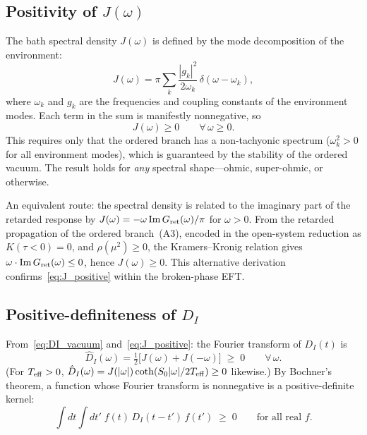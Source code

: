 \documentclass[11pt,a4paper]{article}
\numberwithin{equation}{section}
\begin{document}
\subsection*{Positivity of $J(\omega)$}

The bath spectral density $J(\omega)$ is defined by the mode
decomposition of the environment:
\begin{equation}
  J(\omega)
  = \pi\sum_k \frac{|g_k|^2}{2\omega_k}\,\delta(\omega-\omega_k),
  \label{eq:J_def}
\end{equation}
where $\omega_k$ and $g_k$ are the frequencies and coupling constants
of the environment modes.
Each term in the sum is manifestly nonnegative, so
\begin{equation}
  J(\omega) \geq 0 \qquad\forall\,\omega\geq 0.
  \label{eq:J_positive}
\end{equation}
This requires only that the ordered branch has a
non-tachyonic spectrum ($\omega_k^2>0$ for all environment modes),
which is guaranteed by the stability of the ordered vacuum.
The result holds for \emph{any} spectral shape---ohmic, super-ohmic,
or otherwise.

An equivalent route: the spectral density is related to the imaginary
part of the retarded response by $J(\omega)=-\omega\,{\rm Im}\,
G_{\rm ret}(\omega)/\pi$ for $\omega>0$.
From the retarded propagation of the ordered branch~(A3),
encoded in the open-system reduction as $K(\tau<0)=0$,
and $\rho(\mu^2)\geq 0$, the Kramers--Kronig relation gives $\omega\cdot{\rm Im}\,G_{\rm ret}
(\omega)\leq 0$, hence $J(\omega)\geq 0$.
This alternative derivation confirms~\eqref{eq:J_positive} within
the broken-phase EFT.

\subsection*{Positive-definiteness of $D_I$}

From~\eqref{eq:DI_vacuum} and~\eqref{eq:J_positive}:
the Fourier transform of $D_I(t)$ is
\begin{equation}
  \hat D_I(\omega) = \tfrac{1}{2}\bigl[J(\omega)+J(-\omega)\bigr]
  \;\geq\; 0
  \qquad\forall\,\omega.
\end{equation}
(For $T_{\rm eff}>0$, $\hat D_I(\omega) = J(|\omega|)\coth(S_0|\omega|/
2T_{\rm eff})\geq 0$ likewise.)
By Bochner's theorem, a function whose Fourier transform is
nonnegative is a positive-definite kernel:
\begin{equation}
  \int\!\!dt\int\!\!dt'\;f(t)\,D_I(t-t')\,f(t') \;\geq\; 0
  \qquad\text{for all real }f.
  \label{eq:DI_posdef}
\end{equation}
\end{document}
